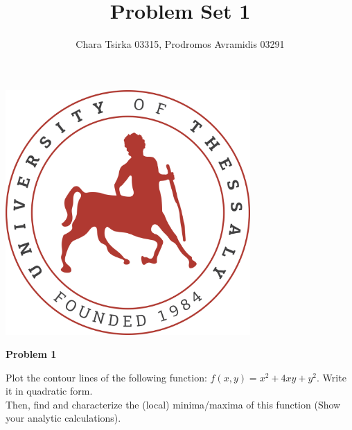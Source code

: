 \documentclass{article}
\title{Problem Set 1}
\author{Chara Tsirka 03315, Prodromos Avramidis 03291}
\begin{document}
\maketitle
\begin{center}
\vspace{5cm}
\includegraphics[width=0.7\textwidth]{uthlogo.png}
\end{center}
\newpage
\noindent \textbf{Problem 1}

\noindent Plot the contour lines of the following function: $f(x,y) = x^2+4xy+y^2$. Write it in quadratic form.\\ Then, find and characterize the (local) minima/maxima of this function (Show your analytic calculations).
\\ \\ \\
\end{document}
